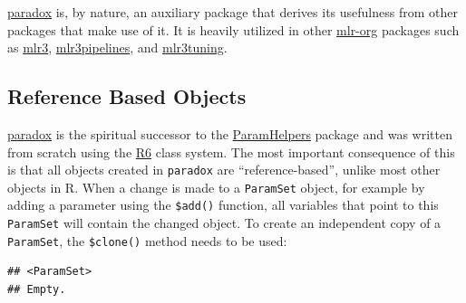 \documentclass[
]{scrbook}
\newenvironment{Shaded}{\begin{snugshade}}{\end{snugshade}}
\newcommand{\AttributeTok}[1]{\textcolor[rgb]{0.77,0.63,0.00}{#1}}
\newcommand{\CommentTok}[1]{\textcolor[rgb]{0.56,0.35,0.01}{\textit{#1}}}
\newcommand{\ConstantTok}[1]{\textcolor[rgb]{0.00,0.00,0.00}{#1}}
\newcommand{\FunctionTok}[1]{\textcolor[rgb]{0.00,0.00,0.00}{#1}}
\newcommand{\NormalTok}[1]{#1}
\newcommand{\OtherTok}[1]{\textcolor[rgb]{0.56,0.35,0.01}{#1}}
\newcommand{\SpecialCharTok}[1]{\textcolor[rgb]{0.00,0.00,0.00}{#1}}
\newcommand{\StringTok}[1]{\textcolor[rgb]{0.31,0.60,0.02}{#1}}
\renewenvironment{Shaded} {\begin{snugshade}\small} {\end{snugshade}}
\begin{document}
\href{https://paradox.mlr-org.com}{paradox} is, by nature, an auxiliary package that derives its usefulness from other packages that make use of it.
It is heavily utilized in other \href{https://github.com/mlr-org}{mlr-org} packages such as \href{https://mlr3.mlr-org.com}{mlr3}, \href{https://mlr3pipelines.mlr-org.com}{mlr3pipelines}, and \href{https://mlr3tuning.mlr-org.com}{mlr3tuning}.

\hypertarget{reference-based-objects}{%
\subsection{Reference Based Objects}\label{reference-based-objects}}

\href{https://paradox.mlr-org.com}{paradox} is the spiritual successor to the \href{https://cran.r-project.org/package=ParamHelpers}{ParamHelpers} package and was written from scratch using the \href{https://cran.r-project.org/package=R6}{R6} class system.
The most important consequence of this is that all objects created in \texttt{paradox} are ``reference-based'', unlike most other objects in R.
When a change is made to a \texttt{ParamSet} object, for example by adding a parameter using the \texttt{\$add()} function, all variables that point to this \texttt{ParamSet} will contain the changed object.
To create an independent copy of a \texttt{ParamSet}, the \texttt{\$clone()} method needs to be used:

\begin{Shaded}
\end{Shaded}

\begin{verbatim}
## <ParamSet>
## Empty.
\end{verbatim}

\begin{Shaded}
\end{Shaded}
\end{document}
